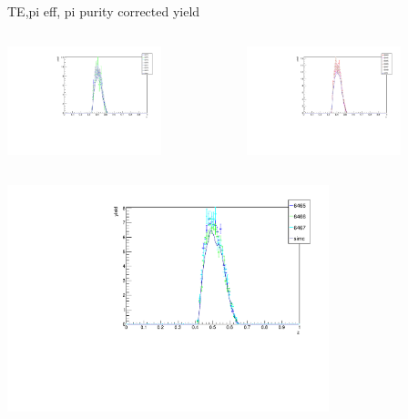 \begin{frame}{TE,pi eff, pi purity corrected yield}
\begin{columns}
\begin{column}[T]{0.5\textwidth}
\includegraphics[width = 0.7\textwidth]{results/yield/check/yieldcheck_300_neg.pdf}
\end{column}
\begin{column}[T]{0.5\textwidth}
\includegraphics[width = 0.7\textwidth]{results/yield/check/yieldcheck_300_pos.pdf}
\end{column}
\end{columns}
\begin{columns}
\begin{column}[T]{0.5\textwidth}
\includegraphics[width = 0.7\textwidth]{results/yield/check/yieldcheck_290_neg.pdf}

\end{column}
\end{columns}
\end{frame}

